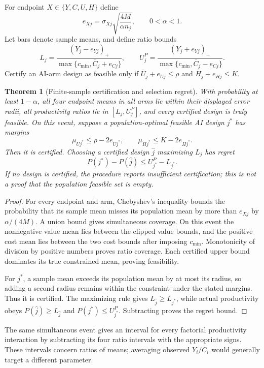 \documentclass[11pt,a4paper]{article}
\newtheorem{theorem}{Theorem}[section]
\theoremstyle{definition}
\theoremstyle{remark}
\begin{document}
For endpoint $X\in\{Y,C,U,H\}$ define
\[
 e_{Xj}=\sigma_{Xj}\sqrt{\frac{4M}{\alpha n_j}},\qquad 0<\alpha<1.
\]
Let bars denote sample means, and define ratio bounds
\[
 L_j=\frac{(\overline Y_j-e_{Yj})_+}
             {\max\{c_{\min},\overline C_j+e_{Cj}\}},\qquad
 U_j^P=\frac{(\overline Y_j+e_{Yj})_+}
             {\max\{c_{\min},\overline C_j-e_{Cj}\}}.
\]
Certify an AI-arm design as feasible only if
$\overline U_j+e_{Uj}\leq\rho$ and $\overline H_j+e_{Hj}\leq K$.

\begin{theorem}[Finite-sample certification and selection regret]\label{th:selection}
With probability at least $1-\alpha$, all four endpoint means in all arms lie within their displayed error radii, all productivity ratios lie in $[L_j,U_j^P]$, and every certified design is truly feasible. On this event, suppose a population-optimal feasible AI design $j^*$ has margins
\[
 \mu_{Uj^*}\leq\rho-2e_{Uj^*},\qquad
 \mu_{Hj^*}\leq K-2e_{Hj^*}.
\]
Then it is certified. Choosing a certified design $\widehat j$ maximizing $L_j$ has regret
\[
 P(j^*)-P(\widehat j)\leq U_{j^*}^P-L_{j^*}.
\]
If no design is certified, the procedure reports insufficient certification; this is not a proof that the population feasible set is empty.
\end{theorem}
\begin{proof}
For every endpoint and arm, Chebyshev's inequality bounds the probability that its sample mean misses its population mean by more than $e_{Xj}$ by $\alpha/(4M)$. A union bound gives simultaneous coverage. On this event the nonnegative value mean lies between the clipped value bounds, and the positive cost mean lies between the two cost bounds after imposing $c_{\min}$. Monotonicity of division by positive numbers proves ratio coverage. Each certified upper bound dominates its true constrained mean, proving feasibility.

For $j^*$, a sample mean exceeds its population mean by at most its radius, so adding a second radius remains within the constraint under the stated margins. Thus it is certified. The maximizing rule gives $L_{\widehat j}\geq L_{j^*}$, while actual productivity obeys $P(\widehat j)\geq L_{\widehat j}$ and $P(j^*)\leq U_{j^*}^P$. Subtracting proves the regret bound.
\end{proof}

The same simultaneous event gives an interval for every factorial productivity interaction by subtracting its four ratio intervals with the appropriate signs. These intervals concern ratios of means; averaging observed $Y_i/C_i$ would generally target a different parameter.
\end{document}
